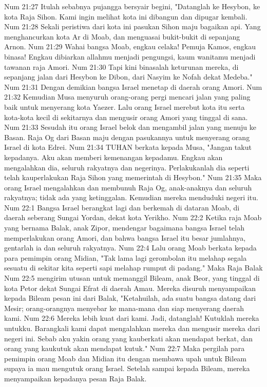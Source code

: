 Num 21:27  Itulah sebabnya pujangga bersyair begini, "Datanglah ke Hesybon, ke kota Raja Sihon. Kami ingin melihat kota ini dibangun dan dipugar kembali.
Num 21:28  Sekali peristiwa dari kota ini pasukan Sihon maju bagaikan api. Yang menghancurkan kota Ar di Moab, dan menguasai bukit-bukit di sepanjang Arnon.
Num 21:29  Wahai bangsa Moab, engkau celaka! Pemuja Kamos, engkau binasa! Engkau dibiarkan allahmu menjadi pengungsi, kaum wanitamu menjadi tawanan raja Amori.
Num 21:30  Tapi kini binasalah keturunan mereka, di sepanjang jalan dari Hesybon ke Dibon, dari Nasyim ke Nofah dekat Medeba."
Num 21:31  Dengan demikian bangsa Israel menetap di daerah orang Amori.
Num 21:32  Kemudian Musa menyuruh orang-orang pergi mencari jalan yang paling baik untuk menyerang kota Yaezer. Lalu orang Israel merebut kota itu serta kota-kota kecil di sekitarnya dan mengusir orang Amori yang tinggal di sana.
Num 21:33  Sesudah itu orang Israel belok dan mengambil jalan yang menuju ke Basan. Raja Og dari Basan maju dengan pasukannya untuk menyerang orang Israel di kota Edrei.
Num 21:34  TUHAN berkata kepada Musa, "Jangan takut kepadanya. Aku akan memberi kemenangan kepadamu. Engkau akan mengalahkan dia, seluruh rakyatnya dan negerinya. Perlakukanlah dia seperti telah kauperlakukan Raja Sihon yang memerintah di Hesybon."
Num 21:35  Maka orang Israel mengalahkan dan membunuh Raja Og, anak-anaknya dan seluruh rakyatnya; tidak ada yang ketinggalan. Kemudian mereka menduduki negeri itu.
Num 22:1  Bangsa Israel berangkat lagi dan berkemah di dataran Moab, di daerah seberang Sungai Yordan, dekat kota Yerikho.
Num 22:2  Ketika raja Moab yang bernama Balak, anak Zipor, mendengar bagaimana bangsa Israel telah memperlakukan orang Amori, dan bahwa bangsa Israel itu besar jumlahnya, gentarlah ia dan seluruh rakyatnya.
Num 22:4  Lalu orang Moab berkata kepada para pemimpin orang Midian, "Tak lama lagi gerombolan itu melahap segala sesuatu di sekitar kita seperti sapi melahap rumput di padang." Maka Raja Balak
Num 22:5  mengirim utusan untuk memanggil Bileam, anak Beor, yang tinggal di kota Petor dekat Sungai Efrat di daerah Amau. Mereka disuruh menyampaikan kepada Bileam pesan ini dari Balak, "Ketahuilah, ada suatu bangsa datang dari Mesir; orang-orangnya menyebar ke mana-mana dan siap menyerang daerah kami.
Num 22:6  Mereka lebih kuat dari kami. Jadi, datanglah! Kutuklah mereka untukku. Barangkali kami dapat mengalahkan mereka dan mengusir mereka dari negeri ini. Sebab aku yakin orang yang kauberkati akan mendapat berkat, dan orang yang kaukutuk akan mendapat kutuk."
Num 22:7  Maka pergilah para pemimpin orang Moab dan Midian itu dengan membawa upah untuk Bileam supaya ia mau mengutuk orang Israel. Setelah sampai kepada Bileam, mereka menyampaikan kepadanya pesan Raja Balak.
